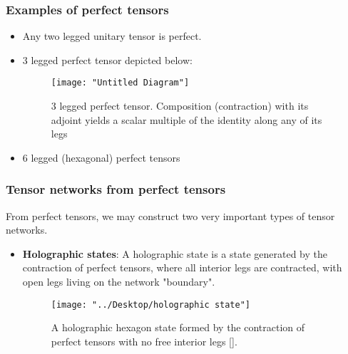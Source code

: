 \documentclass[11pt]{beamer}
\newcommand{\vs}{\vskip10pt}
\begin{document}
\begin{frame}
	
	\frametitle{Examples of perfect tensors}
	
	\begin{itemize}
	\item Any two legged unitary tensor is perfect.

	\vs
	\item 3 legged perfect tensor depicted below: 
	\begin{figure}
		\centering
		\texttt{[image: "Untitled Diagram"]}
		\caption{3 legged perfect tensor. Composition (contraction) with its adjoint yields a scalar multiple of the identity along any of its legs}
		\label{fig:perfect-3-tensor}
	\end{figure}
	\item 6 legged (hexagonal) perfect tensors
	\end{itemize}
	
	\end{frame}


\begin{frame} 
	
	\frametitle{Tensor networks from perfect tensors}
	
	From perfect tensors, we may construct two very important types of tensor networks. 
	
	\begin{itemize}
		\item \textbf{Holographic states}: A holographic state is a state generated by the contraction of perfect tensors, where all interior legs are contracted, with open legs living on the network "boundary".
		
	\begin{figure}
		\centering
		\texttt{[image: "../Desktop/holographic state"]}
		\caption{A holographic hexagon state formed by the contraction of perfect tensors with no free interior legs [].}
		\label{fig:holographic-state}
	\end{figure}
		
	\end{itemize}
	
\end{frame}	
\end{document}
